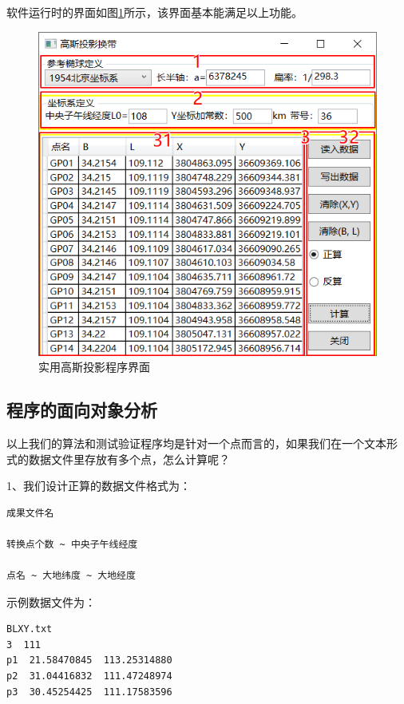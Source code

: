 软件运行时的界面如图\ref{fig:GaussProjUI02}所示，该界面基本能满足以上功能。

\begin{figure}[htbp]
    \centering
    \includegraphics[scale=1]{gaussProj/UI02.png}
    \caption{实用高斯投影程序界面}
    \label{fig:GaussProjUI02}
\end{figure}

\subsection{程序的面向对象分析}

以上我们的算法和测试验证程序均是针对一个点而言的，如果我们在一个文本形
式的数据文件里存放有多个点，怎么计算呢？

1、我们设计正算的数据文件格式为：
\begin{verbatim}
成果文件名

转换点个数 ~ 中央子午线经度

点名 ~ 大地纬度 ~ 大地经度
\end{verbatim}

示例数据文件为：

\begin{verbatim}
BLXY.txt
3  111
p1  21.58470845  113.25314880
p2  31.04416832  111.47248974
p3  30.45254425  111.17583596
\end{verbatim}

